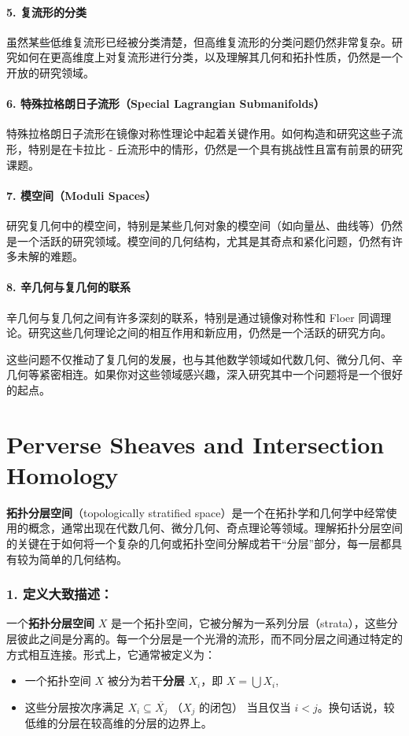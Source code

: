 \documentclass[lang=cn,zihao=5,twoside,fontset=none]{textbook}
\begin{document}
\paragraph*{5. \textbf{复流形的分类}}
   虽然某些低维复流形已经被分类清楚，但高维复流形的分类问题仍然非常复杂。研究如何在更高维度上对复流形进行分类，以及理解其几何和拓扑性质，仍然是一个开放的研究领域。

\paragraph*{6. \textbf{特殊拉格朗日子流形（Special Lagrangian Submanifolds）}}
   特殊拉格朗日子流形在镜像对称性理论中起着关键作用。如何构造和研究这些子流形，特别是在卡拉比 - 丘流形中的情形，仍然是一个具有挑战性且富有前景的研究课题。

\paragraph*{7. \textbf{模空间（Moduli Spaces）}}
   研究复几何中的模空间，特别是某些几何对象的模空间（如向量丛、曲线等）仍然是一个活跃的研究领域。模空间的几何结构，尤其是其奇点和紧化问题，仍然有许多未解的难题。

\paragraph*{8. \textbf{辛几何与复几何的联系}}
   辛几何与复几何之间有许多深刻的联系，特别是通过镜像对称性和 Floer 同调理论。研究这些几何理论之间的相互作用和新应用，仍然是一个活跃的研究方向。

这些问题不仅推动了复几何的发展，也与其他数学领域如代数几何、微分几何、辛几何等紧密相连。如果你对这些领域感兴趣，深入研究其中一个问题将是一个很好的起点。

\section{Perverse Sheaves and Intersection Homology}

\textbf{拓扑分层空间}（topologically stratified space）是一个在拓扑学和几何学中经常使用的概念，通常出现在代数几何、微分几何、奇点理论等领域。理解拓扑分层空间的关键在于如何将一个复杂的几何或拓扑空间分解成若干“分层”部分，每一层都具有较为简单的几何结构。

\subsubsection{1. \textbf{定义大致描述}：}
一个\textbf{拓扑分层空间} $X$ 是一个拓扑空间，它被分解为一系列分层（strata），这些分层彼此之间是分离的。每一个分层是一个光滑的流形，而不同分层之间通过特定的方式相互连接。形式上，它通常被定义为：
\begin{itemize}
    \item 一个拓扑空间 $X$ 被分为若干\textbf{分层} $X_i$，即 $X = \bigcup X_i$,
    \item 这些分层按次序满足 $X_i \subseteq \overline{X_j}$ （$X_j$ 的闭包） 当且仅当 $i < j$。换句话说，较低维的分层在较高维的分层的边界上。
\end{itemize}
\end{document}

